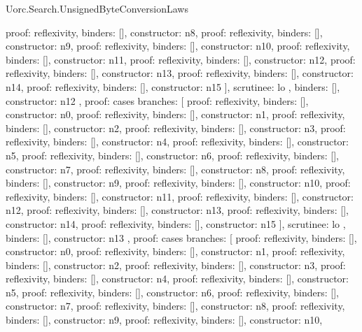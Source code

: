 \begin{lexlean}{Uorc.Search.UnsignedByteConversionLaws}
\begin{semanticmodule}
{{{{            {proof: reflexivity{}, binders: [], constructor: n8},
            {proof: reflexivity{}, binders: [], constructor: n9},
            {proof: reflexivity{}, binders: [], constructor: n10},
            {proof: reflexivity{}, binders: [], constructor: n11},
            {proof: reflexivity{}, binders: [], constructor: n12},
            {proof: reflexivity{}, binders: [], constructor: n13},
            {proof: reflexivity{}, binders: [], constructor: n14},
            {proof: reflexivity{}, binders: [], constructor: n15}
          ],
          scrutinee: lo
        },
        binders: [],
        constructor: n12
      },
      {
        proof: cases{
          branches: [
            {proof: reflexivity{}, binders: [], constructor: n0},
            {proof: reflexivity{}, binders: [], constructor: n1},
            {proof: reflexivity{}, binders: [], constructor: n2},
            {proof: reflexivity{}, binders: [], constructor: n3},
            {proof: reflexivity{}, binders: [], constructor: n4},
            {proof: reflexivity{}, binders: [], constructor: n5},
            {proof: reflexivity{}, binders: [], constructor: n6},
            {proof: reflexivity{}, binders: [], constructor: n7},
            {proof: reflexivity{}, binders: [], constructor: n8},
            {proof: reflexivity{}, binders: [], constructor: n9},
            {proof: reflexivity{}, binders: [], constructor: n10},
            {proof: reflexivity{}, binders: [], constructor: n11},
            {proof: reflexivity{}, binders: [], constructor: n12},
            {proof: reflexivity{}, binders: [], constructor: n13},
            {proof: reflexivity{}, binders: [], constructor: n14},
            {proof: reflexivity{}, binders: [], constructor: n15}
          ],
          scrutinee: lo
        },
        binders: [],
        constructor: n13
      },
      {
        proof: cases{
          branches: [
            {proof: reflexivity{}, binders: [], constructor: n0},
            {proof: reflexivity{}, binders: [], constructor: n1},
            {proof: reflexivity{}, binders: [], constructor: n2},
            {proof: reflexivity{}, binders: [], constructor: n3},
            {proof: reflexivity{}, binders: [], constructor: n4},
            {proof: reflexivity{}, binders: [], constructor: n5},
            {proof: reflexivity{}, binders: [], constructor: n6},
            {proof: reflexivity{}, binders: [], constructor: n7},
            {proof: reflexivity{}, binders: [], constructor: n8},
            {proof: reflexivity{}, binders: [], constructor: n9},
            {proof: reflexivity{}, binders: [], constructor: n10},
}}}}
\end{semanticmodule}
\end{lexlean}
